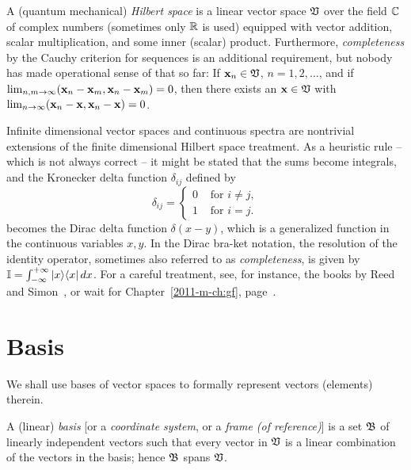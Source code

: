 A (quantum mechanical) {\em Hilbert space}  is a linear
vector space ${\frak V}$ over the field ${\Bbb C}$ of complex numbers
(sometimes only ${\Bbb R}$ is used)
equipped with vector addition, scalar multiplication, and some inner (scalar) product.
Furthermore, {\em completeness}
by the Cauchy criterion for sequences
is an additional requirement,
but nobody has made operational sense of that so far:
If ${\bf x}_n\in {\frak V}$, $n=1,2,\ldots$, and if $\lim_{n,m\rightarrow
\infty} ({\bf x}_n-{\bf x}_m,{\bf x}_n-{\bf x}_m)=0$,
then there exists an ${\bf x}\in {\frak V}$ with
$\lim_{n\rightarrow \infty} ({\bf x}_n-{\bf x},{\bf x}_n-{\bf x})=0$.





Infinite dimensional vector spaces and continuous spectra are nontrivial
extensions of the finite
dimensional Hilbert space treatment. As a heuristic rule -- which is not
always correct -- it might be
stated that the sums become integrals, and the Kronecker delta function
$\delta_{ij}$ defined by
\begin{equation}
\delta_{ij} =\begin{cases}
0  &\text{ for }i\neq j , \\
1  &\text{ for }i = j.
\end{cases}
\end{equation}
becomes the Dirac delta function $\delta (x-y)$, which is a
generalized function in the continuous variables $x,y$.
In the Dirac bra-ket notation, the resolution of the identity operator,
sometimes also referred to as {\em completeness}, is given by
${\Bbb I} = \int_{-\infty}^{+\infty} \vert x\rangle \langle  x\vert \, dx$.
For a careful treatment, see, for instance,
the books by
Reed and Simon~\cite{reed-sim1,reed-sim2},
or wait for Chapter~\ref{2011-m-ch:gf}, page~\pageref{2011-m-ch:gf}.


\section{Basis}
\label{2012-m-ch-fdvs-Basis}

We shall use bases of vector spaces to formally represent vectors (elements) therein.

A (linear) {\em basis}
[or a {\em coordinate system}, or a {\em frame (of reference)}]
is a set    $\frak B$
of linearly independent vectors
such that every vector
in $\frak V$ is a linear combination of the vectors in the basis; hence
$\frak B$ spans $\frak V$.

